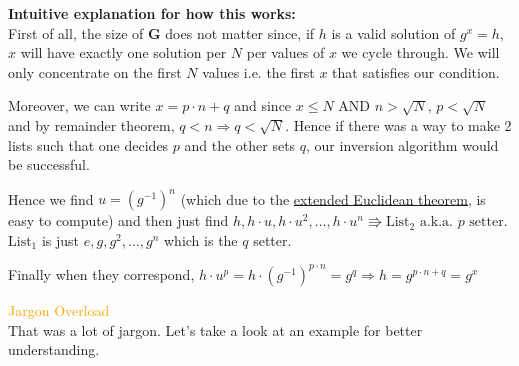		 \begin{mybox}
		 	\textbf{Intuitive explanation for how this works:} \\
		 	First of all, the size of \(\mathbf{G}\) does not matter since, if \(h\) is a valid solution of \(g^x = h\), \(x\) will have exactly one solution per \(N\) per values of $x$ we cycle through. We will only concentrate on the first \(N\) values i.e. the first \(x\) that satisfies our condition.\vspace{0.5cm}

		 	Moreover, we can write \(x= p \cdot n + q\) and since \(x\leq N \text{ AND } n>\sqrt{N}\text{, }p<\sqrt{N}\) and by remainder theorem, \(q<n\Rightarrow q<\sqrt{N}\). Hence if there was a way to make 2 lists such that one decides $p$ and the other sets $q$, our inversion algorithm would be successful.\vspace{0.5cm} 

		 	Hence we find \(u = (g^{-1})^n\) (which due to the \hyperref[theo:extendedEuclid]{extended Euclidean theorem}, is easy to compute) and then just find \(h, h\cdot u, h\cdot u^{2}, \ldots , h \cdot u^{n} \Rrightarrow \text{List}_2 \text{ a.k.a. $p$ setter}\). \(\text{List}_1\) is just \(e, g, g^2, \ldots, g^n\) which is the $q$ setter.\vspace{0.5cm}

		 	Finally when they correspond, \(h\cdot u^{p}=h\cdot (g^{-1})^{p\cdot n}= g^q \Rightarrow h = g^{p \cdot n + q}= g^x\)
		 \end{mybox} 
		 \begin{center}
		 	\Huge \textcolor{orange}{Jargon Overload}\\
		 	\normalsize That was a lot of jargon. Let's take a look at an example for better understanding.
		 \end{center}

